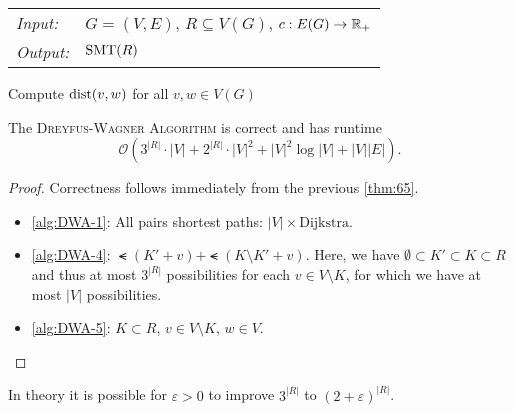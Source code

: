 \documentclass[../skript.tex]{subfiles}
\begin{document}
\begin{algorithmbox}
\begin{tabular}{@{}ll}
\textit{Input:} & $G = (V, E)$, $R \subseteq V(G)$, $c : E(G) \to \mathbb{R}_+$\\
\textit{Output:} & $\operatorname{SMT}(R)$
\end{tabular}
\end{algorithmbox}
\vspace{-7pt}
\begin{algorithm}[H]
Compute $\operatorname*{dist}(v, w)$ for all $v, w \in V(G)$\label{alg:DWA-1}\;
\end{algorithm}
\vspace{-7pt}
\EndAlgorithmLine
\begin{theorem} %
\label{thm:66}
The \textsc{Dreyfus-Wagner Algorithm} is correct and has runtime
\[
	\mathcal{O} \left( 3^{|R|} \cdot |V| + 2^{|R|} \cdot |V|^2 + |V|^2 \log |V| + |V||E| \right).
\]
\end{theorem}
\begin{proof}
Correctness follows immediately from the previous \cref{thm:65}.
\begin{itemize}
\item \cref{alg:DWA-1}: All pairs shortest paths: $|V| \times \text{Dijkstra}$.
\item \cref{alg:DWA-4}: $\smt(K' + v) + \smt(K \setminus K' + v)$. Here, we have $\emptyset \subset K' \subset K \subset R$ and thus at most $3^{|R|}$ possibilities for each $v \in V \setminus K$, for which we have at most $|V|$ possibilities.
\item \cref{alg:DWA-5}: $K \subset R$, $v \in V \setminus K$, $w \in V$.
\end{itemize}
\end{proof}
In theory it is possible for $\varepsilon > 0$ to improve $3^{|R|}$ to $(2+\varepsilon)^{|R|}$.
\end{document}
